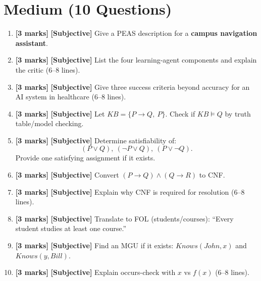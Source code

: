 \documentclass[11pt,a4paper]{article}
\newcommand{\MMarks}{\textbf{[3 marks]} }
\begin{document}
\section*{Medium (10 Questions)}
\begin{enumerate}[label=\textbf{M\arabic*.}, leftmargin=*]
  \item \MMarks \textbf{[Subjective]} Give a PEAS description for a \textbf{campus navigation assistant}.

  \item \MMarks \textbf{[Subjective]} List the four learning-agent components and explain the critic (6--8 lines).

  \item \MMarks \textbf{[Subjective]} Give three success criteria beyond accuracy for an AI system in healthcare (6--8 lines).

  \item \MMarks \textbf{[Subjective]} Let $KB=\{P \rightarrow Q,\ P\}$. Check if $KB \models Q$ by truth table/model checking.

  \item \MMarks \textbf{[Subjective]} Determine satisfiability of:
    \[
      (P \lor Q),\ (\lnot P \lor Q),\ (P \lor \lnot Q).
    \]
    Provide one satisfying assignment if it exists.

  \item \MMarks \textbf{[Subjective]} Convert $(P \rightarrow Q) \land (Q \rightarrow R)$ to CNF.

  \item \MMarks \textbf{[Subjective]} Explain why CNF is required for resolution (6--8 lines).

  \item \MMarks \textbf{[Subjective]} Translate to FOL (students/courses):
    ``Every student studies at least one course.''

  \item \MMarks \textbf{[Subjective]} Find an MGU if it exists: $Knows(John, x)$ and $Knows(y, Bill)$.

  \item \MMarks \textbf{[Subjective]} Explain occurs-check with $x$ vs $f(x)$ (6--8 lines).
\end{enumerate}
\end{document}

